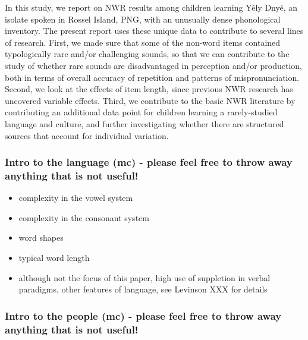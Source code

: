 \documentclass[english,,man,floatsintext]{apa6}
\providecommand{\tightlist}{%
  \setlength{\itemsep}{0pt}\setlength{\parskip}{0pt}}
\begin{document}
In this study, we report on NWR results among children learning Yêly
Dnyé, an isolate spoken in Rossel Island, PNG, with an unusually dense
phonological inventory. The present report uses these unique data to
contribute to several lines of research. First, we made sure that some
of the non-word items contained typologically rare and/or challenging
sounds, so that we can contribute to the study of whether rare sounds
are disadvantaged in perception and/or production, both in terms of
overall accuracy of repetition and patterns of mispronunciation. Second,
we look at the effects of item length, since previous NWR research has
uncovered variable effects. Third, we contribute to the basic NWR
literature by contributing an additional data point for children
learning a rarely-studied language and culture, and further
investigating whether there are structured sources that account for
individual variation.

\subsubsection{\texorpdfstring{Intro to the language (\textbf{mc}) -
please feel free to throw away anything that is not
useful!}{Intro to the language (mc) - please feel free to throw away anything that is not useful!}}\label{intro-to-the-language-mc---please-feel-free-to-throw-away-anything-that-is-not-useful}

\begin{itemize}
\tightlist
\item
  complexity in the vowel system
\item
  complexity in the consonant system
\item
  word shapes
\item
  typical word length
\item
  although not the focus of this paper, high use of suppletion in verbal
  paradigms, other features of language, see Levinson XXX for details
\end{itemize}

\subsubsection{\texorpdfstring{Intro to the people (\textbf{mc}) -
please feel free to throw away anything that is not
useful!}{Intro to the people (mc) - please feel free to throw away anything that is not useful!}}\label{intro-to-the-people-mc---please-feel-free-to-throw-away-anything-that-is-not-useful}
\end{document}
